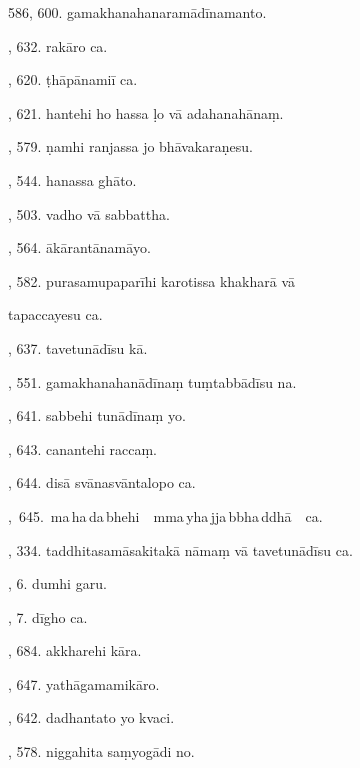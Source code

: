 586, 600. gamakhanahanaramādīnamanto.\hfill \pageref{sut:586}\par {}, 632. rakāro ca.\hfill \pageref{sut:587}\par {}, 620. ṭhāpānamiī ca.\hfill \pageref{sut:588}\par {}, 621. hantehi ho hassa ḷo vā adahanahānaṃ.\hfill \pageref{sut:589}\par {}, 579. ṇamhi ranjassa jo bhāvakaraṇesu.\hfill \pageref{sut:590}\par {}, 544. hanassa ghāto.\hfill \pageref{sut:591}\par {}, 503. vadho vā sabbattha.\hfill \pageref{sut:592}\par {}, 564. ākārantānamāyo.\hfill \pageref{sut:593}\par {}, 582. purasamupaparīhi karotissa khakharā vā\par \noindent
\hspace{15mm} tapaccayesu ca.\hfill \pageref{sut:594}\par {}, 637. tavetunādīsu kā.\hfill \pageref{sut:595}\par {}, 551. gamakhanahanādīnaṃ tuṃtabbādīsu na.\hfill \pageref{sut:596}\par {}, 641. sabbehi tunādīnaṃ yo.\hfill \pageref{sut:597}\par {}, 643. canantehi raccaṃ.\hfill \pageref{sut:598}\par {}, 644. disā svānasvāntalopo ca.\hfill \pageref{sut:599}\par {},~645.~ma\,ha\,da\,bhehi\ \ mma\,yha\,jja\,bbha\,ddhā\ \ ca.\hfill \pageref{sut:600}\par {}, 334. taddhitasamāsakitakā nāmaṃ vā tavetunādīsu ca.\par \noindent
\hspace{15mm} \hfill \pageref{sut:601}\par {}, 6. dumhi garu.\hfill \pageref{sut:602}\par {}, 7. dīgho ca.\hfill \pageref{sut:603}\par {}, 684. akkharehi kāra.\hfill \pageref{sut:604}\par {}, 647. yathāgamamikāro.\hfill \pageref{sut:605}\par {}, 642. dadhantato yo kvaci.\hfill \pageref{sut:606}\par {}, 578. niggahita saṃyogādi no.\hfill \pageref{sut:607}\par \noindent
